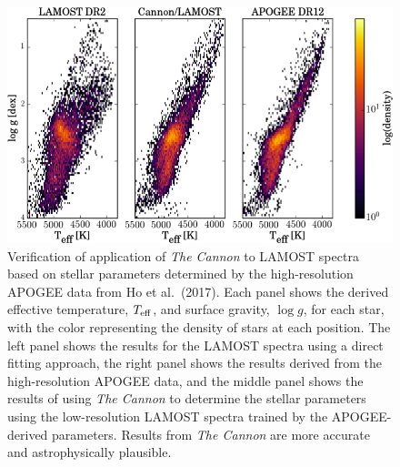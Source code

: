 \documentclass[oneside,11pt]{amsart}
\newcommand{\comment}[2][todo]{{\color{#1}[[{\bf #2}]]}}
\begin{document}
%
%
%
%
%
%

\begin{figure}[h!]
%
\vskip -0.1in
%
\includegraphics[width=\textwidth]{CannonLAMOST.jpg}
%
\caption{\small Verification of application of {\it The Cannon} to
LAMOST spectra based on stellar parameters determined by the
high-resolution APOGEE data from Ho et al.\ (2017).  Each panel shows
the derived effective temperature, $T_{\rm eff}$, and surface gravity,
$\log g$, for each star, with the color representing the density of
stars at each position.  The left panel shows the results for the LAMOST
spectra using a direct fitting approach, the right panel shows the
results derived from the high-resolution APOGEE data, and the middle
panel shows the results of using {\it The Cannon} to determine the
stellar parameters using the low-resolution LAMOST spectra trained by
the APOGEE-derived parameters.  Results from {\it The Cannon} are more
accurate and astrophysically plausible.}
%
\label{fig:Cannon}
%
\end{figure}
\end{document}
